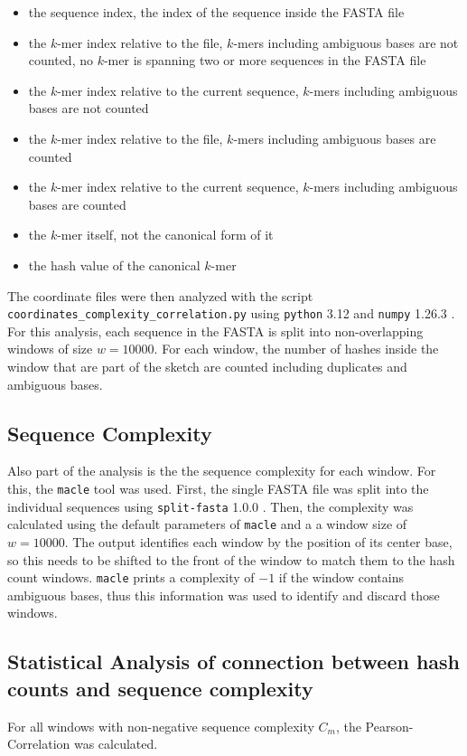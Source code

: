 \begin{itemize}
  \item the sequence index, the index of the sequence inside the FASTA file
  \item the $k$-mer index relative to the file, $k$-mers including
  ambiguous bases are not counted, no $k$-mer is spanning two or more sequences
  in the FASTA file
  \item the $k$-mer index relative to the current sequence, $k$-mers including
  ambiguous bases are not counted
  \item the $k$-mer index relative to the file, $k$-mers including ambiguous
  bases are counted
  \item the $k$-mer index relative to the current sequence, $k$-mers including
  ambiguous bases are counted
  \item the $k$-mer itself, not the canonical form of it
  \item the hash value of the canonical $k$-mer
\end{itemize}

The coordinate files were then analyzed with the script
\texttt{coordinates\_complexity\_correlation.py} using \texttt{python} 3.12
 and \texttt{numpy} 1.26.3 \cite{ArrayProgrammingNumPy}. For this
analysis, each sequence in the FASTA is split into non-overlapping windows of
size $w=10000$. For each window, the number of hashes inside the window that are
part of the sketch are counted including duplicates and ambiguous bases.

\subsection*{Sequence Complexity}
Also part of the analysis is the the sequence complexity for each window. For
this, the \texttt{macle} tool \cite{pirogovHighcomplexityRegionsMammalian2019}
was used. First, the single FASTA file was split into the individual sequences
using \texttt{split-fasta} 1.0.0 . Then, the complexity was
calculated using the default parameters of \texttt{macle} and a a window size of
$w=10000$. The output identifies each window by the position of its center base,
so this needs to be shifted to the front of the window to match them to the hash
count windows. \texttt{macle} prints a complexity of $-1$ if the window contains
ambiguous bases, thus this information was used to identify and discard those
windows.

\subsection*{Statistical Analysis of connection between hash counts and sequence complexity}
For all windows with non-negative sequence complexity $C_m$, the
Pearson-Correlation  was calculated. 

